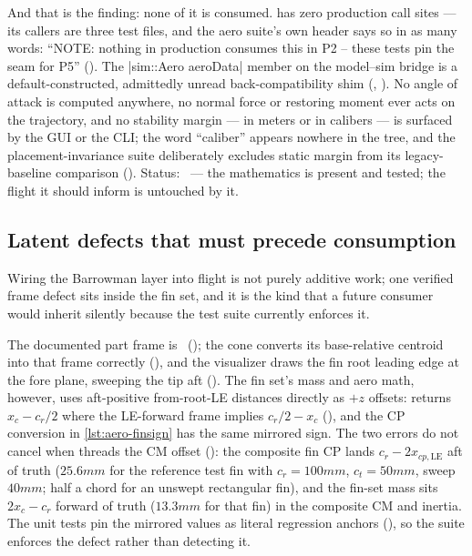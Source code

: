 And that is the finding: none of it is consumed.  has zero production call
sites --- its callers are three test files, and the aero suite's own header says so in as many
words: ``NOTE: nothing in production consumes this in P2 -- these tests pin the seam for P5''
(). The \cppinline|sim::Aero aeroData| member on the
model--sim bridge is a default-constructed, admittedly unread back-compatibility shim
(, ). No angle of attack is computed anywhere, no
normal force or restoring moment ever acts on the trajectory, and no stability margin --- in meters
or in calibers --- is surfaced by the GUI or the CLI; the word ``caliber'' appears nowhere in the
tree, and the placement-invariance suite deliberately excludes static margin from its
legacy-baseline comparison (). Status: \fpartial\ ---
the mathematics is present and tested; the flight it should inform is untouched by it.

\subsection{Latent defects that must precede consumption}\label{sec:aero-latent}

Wiring the Barrowman layer into flight is not purely additive work; one verified frame defect sits
inside the fin set, and it is the kind that a future consumer would inherit silently because the
test suite currently enforces it.

\begin{hardfail}
The documented part frame is \zfwd\ (); the cone converts its
base-relative centroid into that frame correctly (), and
the visualizer draws the fin root leading edge at the fore plane, sweeping the tip aft
(). The fin set's mass and aero math, however, uses
aft-positive from-root-LE distances directly as $+z$ offsets:  returns
$x_{c} - c_r/2$ where the LE-forward frame implies $c_r/2 - x_{c}$
(), and the CP conversion in \cref{lst:aero-finsign} has the same
mirrored sign. The two errors do not cancel when  threads the CM offset
(): the composite fin CP lands $c_r - 2x_{cp,\mathrm{LE}}$ aft of
truth ($25.6\unit{mm}$ for the reference test fin with $c_r = 100\unit{mm}$, $c_t = 50\unit{mm}$,
sweep $40\unit{mm}$; half a chord for an unswept rectangular fin), and the fin-set mass sits
$2x_{c} - c_r$ forward of truth ($13.3\unit{mm}$ for that fin) in the composite CM and inertia.
The unit tests pin the mirrored values as literal regression anchors
(), so the suite enforces the defect rather than detecting
it. \fail
\end{hardfail}

